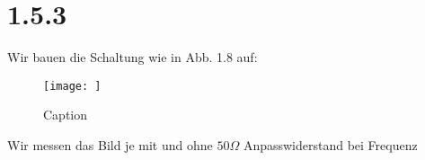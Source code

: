 \documentclass[main.tex]{subfiles}
\begin{document}
\section{1.5.3}
Wir bauen die Schaltung wie in Abb. 1.8 auf:
\begin{figure}
    \centering
    \texttt{[image: ]}
    \caption{Caption}
    \label{fig:my_label}
\end{figure}

Wir messen das Bild je mit und ohne $50 \Omega$ Anpasswiderstand bei Frequenz
\end{document}

